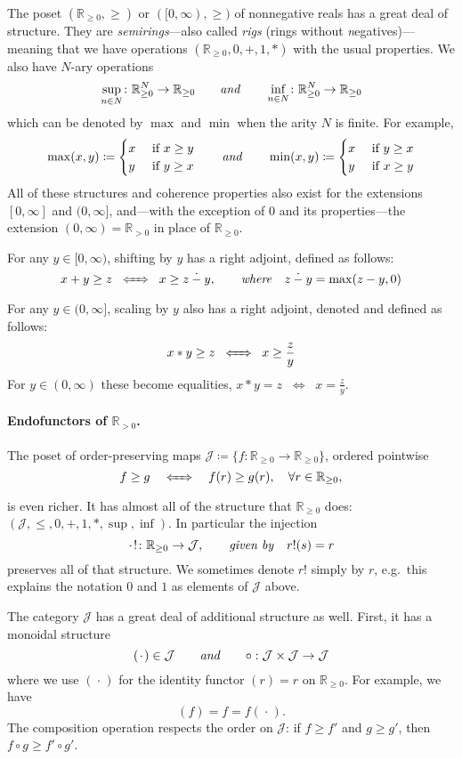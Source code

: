 \documentclass[11pt, one side, article]{memoir}
\theoremstyle{definition}
\theoremstyle{plain}
\newcommand{\cat}[1]{\mathcal{#1}}%
\newcommand{\tn}[1]{\textnormal{#1}}
\newcommand{\rr}{\mathbb{R}}
\newcommand{\const}[1][\blank]{#1 !}
\newcommand{\blank}[1][1pt]{\hspace{#1}\cdot\hspace{#1}}
\newcommand{\hh}[2][]{#1 \tn{\textit{#2}} #1}
\newcommand{\qqand}{\hh[\qquad]{and}}
\renewcommand{\iff}[1][\;\;]{#1\Leftrightarrow#1}
\newcommand{\ifff}[1][\;\;]{#1\xLeftrightarrow{\quad}#1}
\newcommand{\hi}[4][]{#1 #2 \tn{\textit{#4}} #3}
\newcommand{\where}[1][,]{\hi[#1]{\qquad}{\quad}{where}}
\newcommand{\rrpos}{\rr_{>0}}
\newcommand{\rrnon}{\rr_{\geq0}}
\newcommand{\dotminus}{\mathbin{\dot{-}}}
\newcommand{\xid}[1][\blank]{(#1)}
\begin{document}
The poset $(\rrnon,\geq)$ or $([0,\infty),\geq)$ of nonnegative reals has a great deal of structure. They are \emph{semirings}---also called \emph{rigs} (rings without \emph{n}egatives)---meaning that we have operations $(\rrnon,0,+,1,*)$ with the usual properties. We also have $N$-ary operations
\[
	\sup_{n\in N}\colon\rrnon^N\to\rrnon
	\qqand
	\inf_{n\in N}\colon\rrnon^N\to\rrnon	
\]
which can be denoted by $\max$ and $\min$ when the arity $N$ is finite. For example,
\[
\max(x,y)\coloneqq
\begin{cases}
	x&\tn{ if }x\geq y\\
	y&\tn{ if }y\geq x
\end{cases}
\qqand
\min(x,y)\coloneqq
\begin{cases}
	x&\tn{ if }y\geq x\\
	y&\tn{ if }x\geq y
\end{cases}
\]
All of these structures and coherence properties also exist for the extensions $[0,\infty]$ and $(0, \infty]$, and---with the exception of $0$ and its properties---the extension $(0,\infty)=\rrpos$ in place of $\rrnon$.

For any $y\in[0,\infty)$, shifting by $y$ has a right adjoint, defined as follows:
\[
x+y\geq z\ifff x\geq z\dotminus y
\where
z\dotminus y=\max(z-y,0)
\]
For any $y\in(0,\infty]$, scaling by $y$ also has a right adjoint, denoted and defined as follows:
\[
x*y\geq z\ifff x\geq \frac{z}{y}
\]
For $y\in(0,\infty)$ these become equalities, $x*y = z\iff x = \frac{z}{y}$.

\paragraph{Endofunctors of $\rrpos$.}

The poset of order-preserving maps $\cat{J}\coloneqq\{f\colon\rrnon\to\rrnon\}$, ordered pointwise
\[
f\geq g\ifff[\quad] f(r)\geq g(r),\quad \forall r\in\rrnon,
\]
is even richer. It has almost all of the structure that $\rrnon$ does: $(\cat{J},\leq,0,+,1,*,\sup,\inf)$. In particular the injection
\[
  \const\colon\rrnon\to\cat{J}
  \hi[,]{\qquad}{\quad}{given by}
  \const[r](s)=r
\]
preserves all of that structure. We sometimes denote $\const[r]$ simply by $r$, e.g.\ this explains the notation $0$ and $1$ as elements of $\cat{J}$ above.

The category $\cat{J}$ has a great deal of additional structure as well. First, it has a monoidal structure
\[
	\xid\in\cat{J}
	\qqand
	\circ:\cat{J}\times\cat{J}\to\cat{J}
\]
where we use $\xid$ for the identity functor $\xid[r]=r$ on $\rrnon$. For example, we have
\[\xid[f]=f=f\xid.\]
The composition operation respects the order on $\cat{J}$: if $f\geq f'$ and $g\geq g'$, then $f\circ g\geq f'\circ g'$. 
\end{document}
